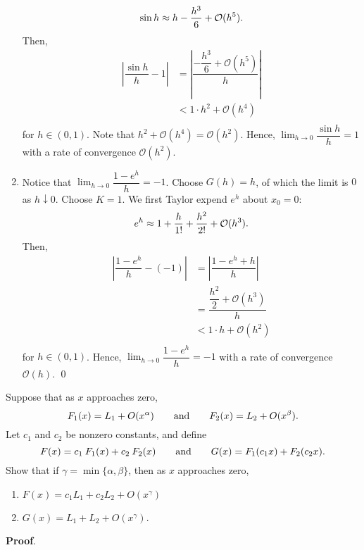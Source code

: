 \documentclass[11pt]{article}
\theoremstyle{break}
\numberwithin{equation}{theorem}
\begin{document}
\begin{enumerate}
    \begin{equation*}
        \sin h\approx h-\dfrac{h^3}{6}+\mathcal{O}(h^5). \vspace{-0.6em}
    \end{equation*}
    Then, \vspace{-0.6em}
    \begin{align*}
        \left\lvert \dfrac{\sin h}{h}-1\right\rvert&=\left\lvert \dfrac{-\dfrac{h^3}{6}+\mathcal{O}(h^5)}{h}\right\rvert\\
        &<1\cdot h^2+\mathcal{O}(h^4)\\[-3.4em]
    \end{align*}
    for $h\in(0, 1)$. Note that $h^2+\mathcal{O}(h^4)=\mathcal{O}(h^2)$. Hence, $\displaystyle\lim_{h\to 0}\dfrac{\sin h}{h}=1$ with a rate of convergence $\mathcal{O}(h^2)$.
    \item Notice that $\displaystyle\lim_{h\to 0}\dfrac{1-e^h}{h}=-1$. Choose $G(h)=h$, of which the limit is $0$ as $h\downarrow 0$. Choose $K=1$. We first Taylor expend $e^h$ about $x_0=0$: \vspace{-0.6em}
    \begin{equation*}
        e^h\approx1+\dfrac{h}{1!}+\dfrac{h^2}{2!}+\mathcal{O}(h^3). \vspace{-0.6em}
    \end{equation*}
    Then, \vspace{-0.6em}
    \begin{align*}
        \left\lvert \dfrac{1-e^h}{h}-(-1)\right\rvert&=\left\lvert \dfrac{1-e^h+h}{h}\right\rvert\\
        &=\dfrac{\dfrac{h^2}{2}+\mathcal{O}(h^3)}{h}\\
        &<1\cdot h+\mathcal{O}(h^2)\\[-3.4em]
    \end{align*}
    for $h\in(0, 1)$. Hence, $\displaystyle\lim_{h\to 0}\dfrac{1-e^h}{h}=-1$ with a rate of convergence $\mathcal{O}(h)$. \qed
\end{enumerate}

\newpage
\begin{problem}\label{problem 11}
    Suppose that as $x$ approaches zero, \vspace{-0.6em}
    \begin{equation*}
        F_1(x)=L_1+O(x^\alpha)\qquad\text{and}\qquad F_2(x)=L_2+O(x^\beta). \vspace{-0.6em}
    \end{equation*}
    Let $c_1$ and $c_2$ be nonzero constants, and define \vspace{-0.6em}
    \begin{equation*}
        F(x)=c_1\:F_1(x)+c_2\:F_2(x)\qquad\text{and}\qquad G(x)=F_1(c_1x)+F_2(c_2x). \vspace{-0.6em}
    \end{equation*}
    Show that if $\gamma=\min\{\alpha, \beta\}$, then as $x$ approaches zero,
    \begin{enumerate}
        \item $F(x)=c_1L_1+c_2L_2+O(x^\gamma)$
        \item $G(x)=L_1+L_2+O(x^\gamma)$.
    \end{enumerate}
\end{problem}
\textbf{Proof}.
\end{document}
